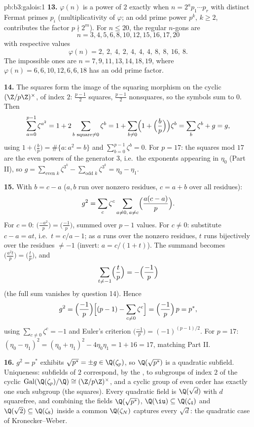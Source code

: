 \begin{solution}{pb:b3:galois:1}
\textbf{13.} $\varphi(n)$ is a power of $2$ exactly when $n =
2^a p_1\cdots p_r$ with distinct Fermat primes $p_i$
(multiplicativity of $\varphi$; an odd prime power $p^k$, $k
\geq 2$, contributes the factor $p \nmid 2^m$). For $n \leq
20$, the  regular $n$-gons are
\[
n = 3, 4, 5, 6, 8, 10, 12, 15, 16, 17, 20
\]
with respective values
\[
\varphi(n) = 2,\ 2,\ 4,\ 2,\ 4,\ 4,\ 4,\ 8,\ 8,\ 16,\ 8 .
\]
The impossible ones are $n = 7, 9, 11, 13, 14, 18, 19$, where
$\varphi(n) = 6, 6, 10, 12, 6, 6, 18$ has an odd prime factor.

\textbf{14.} The squares form the image of the squaring
morphism on the cyclic $(\Z/p\Z)^\times$, of index $2$:
$\frac{p-1}2$ squares, $\frac{p-1}2$ nonsquares, so the
symbols sum to $0$. Then
\[
\sum_{a=0}^{p-1}\zeta^{a^2} = 1 + 2\sum_{b \text{ square}
\neq 0}\zeta^b
= 1 + \sum_{b\neq0}\Bigl(1 + \Bigl(\frac bp\Bigr)\Bigr)
\zeta^b = \sum_{b}\zeta^b + g = g,
\]
using $1 + \bigl(\frac bp\bigr) = \#\{a : a^2 = b\}$ and
$\sum_{b=0}^{p-1}\zeta^b = 0$. For $p = 17$: the squares mod
$17$ are the even powers of the generator $3$, i.e.\ the
exponents appearing in $\eta_0$ (Part II), so $g =
\sum_{\text{even }k}\zeta^{3^k} - \sum_{\text{odd }k}
\zeta^{3^k} = \eta_0 - \eta_1$.

\textbf{15.} With $b = c - a$ ($a, b$ run over nonzero
residues, $c = a + b$ over all residues):
\[
g^2 = \sum_c\zeta^c\sum_{a\neq0,\,a\neq c}
\Bigl(\frac{a(c-a)}p\Bigr) .
\]
For $c = 0$: $\bigl(\frac{-a^2}p\bigr) =
\bigl(\frac{-1}p\bigr)$, summed over $p - 1$ values. For $c \neq 0$: substitute $c - a = at$, i.e.\ $t = c/a -
1$; as $a$ runs over the nonzero residues, $t$ runs
bijectively over the residues $\neq -1$ (invert: $a = c/(1 +
t)$). The summand becomes $\bigl(\frac{a^2t}p\bigr) =
\bigl(\frac tp\bigr)$, and
\[
\sum_{t \neq -1}\Bigl(\frac tp\Bigr)
= -\Bigl(\frac{-1}p\Bigr)
\]
(the full sum vanishes by question 14). Hence
\[
g^2 = \Bigl(\frac{-1}p\Bigr)\Bigl[(p-1) -
\sum_{c\neq0}\zeta^c\Bigr]
= \Bigl(\frac{-1}p\Bigr)\,p = p^* ,
\]
using $\sum_{c\neq0}\zeta^c = -1$ and Euler's criterion
$\bigl(\frac{-1}p\bigr) = (-1)^{(p-1)/2}$. For $p = 17$:
$(\eta_0 - \eta_1)^2 = (\eta_0 + \eta_1)^2 - 4\eta_0\eta_1 =
1 + 16 = 17$, matching Part II.

\textbf{16.} $g^2 = p^*$ exhibits $\sqrt{p^*} = \pm g \in
\Q(\zeta_p)$, so $\Q(\sqrt{p^*})$ is a quadratic subfield.
Uniqueness: subfields of  $2$ correspond, by the , to subgroups of index $2$ of the cyclic
$\operatorname{Gal}(\Q(\zeta_p)/\Q) \cong (\Z/p\Z)^\times$,
and a cyclic group of even order has exactly one such
subgroup (the squares). Every quadratic field is
$\Q(\sqrt{d})$ with $d$ squarefree, and combining the fields
$\Q(\sqrt{p^*})$, $\Q(\iu) \subseteq \Q(\zeta_4)$ and
$\Q(\sqrt2) \subseteq \Q(\zeta_8)$ inside a common
$\Q(\zeta_N)$ captures every $\sqrt d$: the quadratic case of
Kronecker--Weber.


\end{solution}
